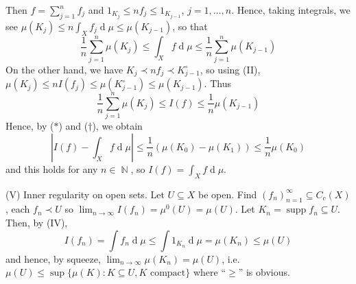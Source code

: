 \documentclass[12pt, a4paper]{memoir}
\DeclareMathOperator{\N}{{\mathbb{N}}}
\theoremstyle{nonumberplain}
\DeclareMathOperator{\supp}{supp}
\renewcommand{\d}[1]{\ensuremath{\operatorname{d}\!{#1}}} %
\begin{document}
Then $f=\sum_{j=1}^n f_j$ and $1_{K_j}\leq nf_j\leq 1_{K_{j-1}}$, $j=1,\ldots,n$.
Hence, taking integrals, we see $\mu(K_j)\leq n\int_X f_j\d{\mu}\leq \mu(K_{j-1})$, so that
\begin{equation*}
    \frac{1}{n}\sum_{j=1}^n\mu(K_j)\leq \int_X f\d{\mu}\leq\frac{1}{n}\sum_{j=1}^n\mu(K_{j-1})\tag{$*$}
\end{equation*}
On the other hand, we have $K_j\prec nf_j\prec K_{j-1}^\circ$, so using (II), $\mu(K_j)\leq nI(f_j)\leq\mu(K_{j-1}^\circ)\leq\mu(K_{j-1})$.
Thus
\begin{equation*}
    \frac{1}{n}\sum_{j=1}^n\mu(K_j)\leq I(f)\leq\frac{1}{n}\mu(K_{j-1})\tag{$\dagger$}
\end{equation*}
Hence, by ($*$) and ($\dagger$), we obtain
\begin{equation*}
    |I(f)-\int_X f\d{\mu}|\leq\frac{1}{n}(\mu(K_0)-\mu(K_1))\leq\frac{1}{n}\mu(K_0)
\end{equation*}
and this holds for any $n\in\N$, so $I(f)=\int_X f\d{\mu}$.

(V) Inner regularity on open sets.
Let $U\subseteq X$ be open.
Find $(f_n)_{n=1}^\infty\subseteq C_c(X)$, each $f_n\prec U$ so $\lim_{n\to\infty}I(f_n)=\mu^0(U)=\mu(U)$.
Let $K_n=\supp f_n\subseteq U$.
Then, by (IV),
\begin{equation*}
    I(f_n)=\int f_n\d{\mu}\leq\int 1_{K_n}\d{\mu}=\mu(K_n)\leq \mu(U)
\end{equation*}
and hence, by squeeze, $\lim_{n\to\infty}\mu(K_n)=\mu(U)$, i.e. $\mu(U)\leq\sup\{\mu(K):K\subseteq U,K\text{ compact}\}$ where ``$\geq$'' is obvious.
\end{document}
